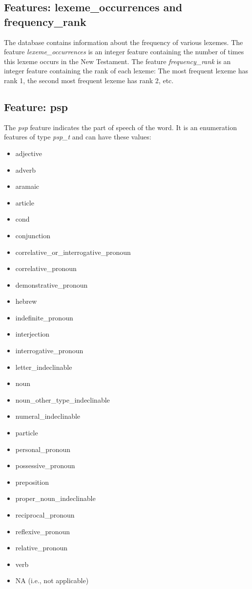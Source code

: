 \documentclass[11pt,oneside,a4paper]{memoir}
\begin{document}
\subsection{Features: lexeme\_occurrences and frequency\_rank}

The database contains information about the frequency of various lexemes. The feature
\emph{lexeme\_occurrences} is an integer feature containing the number of times this lexeme
occurs in the New Testament. The feature \emph{frequency\_rank} is an integer feature containing the
rank of each lexeme: The most frequent lexeme has rank 1, the second most frequent lexeme has rank
2, etc.


\subsection{Feature: psp}

The \emph{psp} feature indicates the part of speech of the word. It is an enumeration features of
type \emph{psp\_t} and can have these values:

\begin{itemize}
\item adjective
\item adverb
\item aramaic
\item article
\item cond
\item conjunction
\item correlative\_or\_interrogative\_pronoun
\item correlative\_pronoun
\item demonstrative\_pronoun
\item hebrew
\item indefinite\_pronoun
\item interjection
\item interrogative\_pronoun
\item letter\_indeclinable
\item noun
\item noun\_other\_type\_indeclinable
\item numeral\_indeclinable
\item particle
\item personal\_pronoun
\item possessive\_pronoun
\item preposition
\item proper\_noun\_indeclinable
\item reciprocal\_pronoun
\item reflexive\_pronoun
\item relative\_pronoun
\item verb
\item NA (i.e., not applicable)
\end{itemize}
\end{document}
